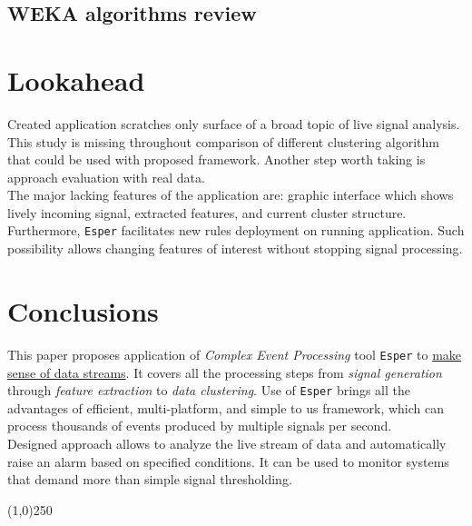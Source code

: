 \documentclass[11pt, letterpaper]{article}            %
\begin{document}
\subsection{WEKA algorithms review}

\section{Lookahead}
Created application scratches only surface of a broad topic of live signal analysis.\\
This study is missing throughout comparison of different clustering algorithm that could be used with proposed framework. Another step worth taking is approach evaluation with real data.\\

The major lacking features of the application are: graphic interface which shows lively incoming signal, extracted features, and current cluster structure.\\
Furthermore, \texttt{Esper} facilitates new rules deployment on running application. Such possibility allows changing features of interest without stopping signal processing.\\

\section{Conclusions}
This paper proposes application of \emph{Complex Event Processing} tool \texttt{Esper} to \underline{make sense of data streams}. It covers all the processing steps from \emph{signal generation} through \emph{feature extraction} to \emph{data clustering}. Use of \texttt{Esper} brings all the advantages of efficient, multi-platform, and simple to us framework, which can process thousands of events produced by multiple signals per second.\\

Designed approach allows to analyze the live stream of data and automatically raise an alarm based on specified conditions. It can be used to monitor systems that demand more than simple signal thresholding.\\



\begin{center} \noindent \line(1,0){250} \end{center}       %


\newpage                                                                 %
{}

\end{document}
